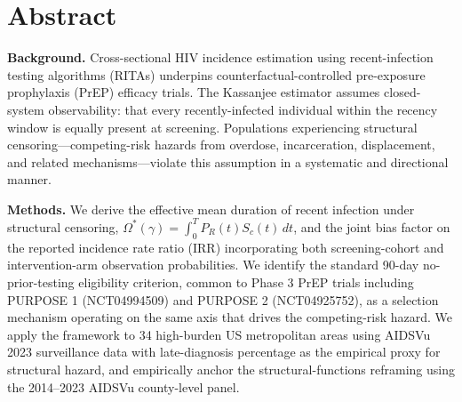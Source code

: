 \documentclass[12pt]{article}
\begin{document}
\newpage

\section*{Abstract}

\noindent\textbf{Background.} Cross-sectional HIV incidence estimation using recent-infection testing algorithms (RITAs) underpins counterfactual-controlled pre-exposure prophylaxis (PrEP) efficacy trials. The Kassanjee estimator assumes closed-system observability: that every recently-infected individual within the recency window is equally present at screening. Populations experiencing structural censoring---competing-risk hazards from overdose, incarceration, displacement, and related mechanisms---violate this assumption in a systematic and directional manner.

\medskip
\noindent\textbf{Methods.} We derive the effective mean duration of recent infection under structural censoring, $\Omega^*(\gamma) = \int_0^T P_R(t) S_c(t)\, dt$, and the joint bias factor on the reported incidence rate ratio (IRR) incorporating both screening-cohort and intervention-arm observation probabilities. We identify the standard 90-day no-prior-testing eligibility criterion, common to Phase 3 PrEP trials including PURPOSE 1 (NCT04994509) and PURPOSE 2 (NCT04925752), as a selection mechanism operating on the same axis that drives the competing-risk hazard. We apply the framework to 34 high-burden US metropolitan areas using AIDSVu 2023 surveillance data with late-diagnosis percentage as the empirical proxy for structural hazard, and empirically anchor the structural-functions reframing using the 2014--2023 AIDSVu county-level panel.
\end{document}
